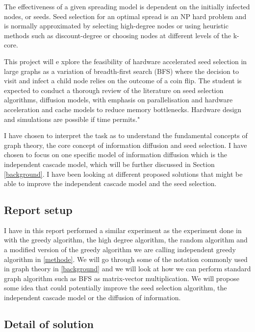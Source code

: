 The effectiveness of a given spreading model is dependent on the initially infected nodes, or seeds. Seed selection for an optimal spread is an NP hard problem and is normally approximated by selecting high-degree nodes or using heuristic methods such as discount-degree or choosing nodes at different levels of the k-core.

This project will e xplore the feasibility of hardware accelerated seed selection in large graphs as a variation of breadth-first search (BFS) where the decision to visit and infect a child node relies on the outcome of a coin flip. The student is expected to conduct a thorough review of the literature on seed selection algorithms, diffusion models, with emphasis on parallelisation and hardware acceleration and cache models to reduce memory bottlenecks. Hardware design and simulations are possible if time permits."


I have chosen to interpret the task as to understand the fundamental concepts of graph theory, the core concept of information diffusion and seed selection. I have chosen to focus on one specific model of information diffusion which is the independent cascade model, which will be further discussed in Section \ref{background}. I have been looking at different proposed solutions that might be able to improve the independent cascade model and the seed selection.

\subsection{Report setup}
I have in this report performed a similar experiment as the experiment done in \cite{MaximizeSpread2003} with the greedy algorithm, the high degree algorithm, the random algorithm and a modified version of the greedy algorithm we are calling independent greedy algorithm in \ref{methode}. We will go through some of the notation commonly used in graph theory in \ref{background} and we will look at how we can perform standard graph algorithm such as BFS as matrix-vector multiplication. We will propose some idea that could potentially improve the seed selection algorithm, the independent cascade model or the diffusion of information. 

\subsection{Detail of solution}
